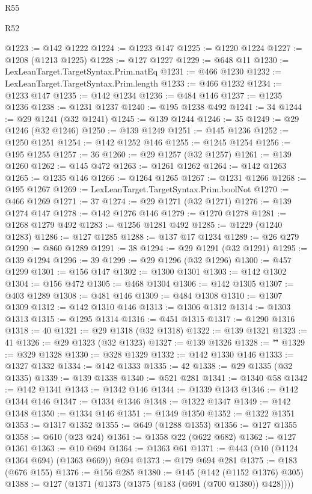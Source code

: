 \begin{lexlean}{R55}
\begin{lexlean}{R52}
\begin{coremodule}
{{{{{{{{{{{{{{{{{{{{{{{{{{{{{{{{{{{{{{{{{{{{{{{{{{{{{{{{{{{{{{{{{{{{{{{{{{{{{{{{{{{{{{{{{{{{{{{{{{{{{{{{{{{{{{{{{{{{{{{{{{{{{{{{{{{{{{{{{{{{{{{{{{{{{{{{{{{{{{{{{{{{{{{{{{{{{{{{{{{{{{{{{{{{{{{{{{{{{{@1223 := @142 @1222
@1224 := @1223 @147
@1225 := @1220 @1224
@1227 := @1208 (@1213 @1225)
@1228 := @127 @1227
@1229 := @648 @11
@1230 := LexLeanTarget.TargetSyntax.Prim.natEq
@1231 := @466 @1230
@1232 := LexLeanTarget.TargetSyntax.Prim.length
@1233 := @466 @1232
@1234 := @1233 @147
@1235 := @142 @1234
@1236 := @484 @146
@1237 := @1235 @1236
@1238 := @1231 @1237
@1240 := @195 @1238 @492
@1241 := 34
@1244 := @29 @1241 (@32 @1241)
@1245 := @139 @1244
@1246 := 35
@1249 := @29 @1246 (@32 @1246)
@1250 := @139 @1249
@1251 := @145 @1236
@1252 := @1250 @1251
@1254 := @142 @1252 @146
@1255 := @1245 @1254
@1256 := @195 @1255
@1257 := 36
@1260 := @29 @1257 (@32 @1257)
@1261 := @139 @1260
@1262 := @145 @472
@1263 := @1261 @1262
@1264 := @142 @1263
@1265 := @1235 @146
@1266 := @1264 @1265
@1267 := @1231 @1266
@1268 := @195 @1267
@1269 := LexLeanTarget.TargetSyntax.Prim.boolNot
@1270 := @466 @1269
@1271 := 37
@1274 := @29 @1271 (@32 @1271)
@1276 := @139 @1274 @147
@1278 := @142 @1276 @146
@1279 := @1270 @1278
@1281 := @1268 @1279 @492
@1283 := @1256 @1281 @492
@1285 := @1229 (@1240 @1283)
@1286 := @127 @1285
@1288 := @137 @17 @1234
@1289 := @26 @279
@1290 := @860 @1289
@1291 := 38
@1294 := @29 @1291 (@32 @1291)
@1295 := @139 @1294
@1296 := 39
@1299 := @29 @1296 (@32 @1296)
@1300 := @457 @1299
@1301 := @156 @147
@1302 := @1300 @1301
@1303 := @142 @1302
@1304 := @156 @472
@1305 := @468 @1304
@1306 := @142 @1305
@1307 := @403 @1289
@1308 := @481 @146
@1309 := @484 @1308
@1310 := @1307 @1309
@1312 := @142 @1310 @146
@1313 := @1306 @1312
@1314 := @1303 @1313
@1315 := @1295 @1314
@1316 := @451 @1315
@1317 := @1290 @1316
@1318 := 40
@1321 := @29 @1318 (@32 @1318)
@1322 := @139 @1321
@1323 := 41
@1326 := @29 @1323 (@32 @1323)
@1327 := @139 @1326
@1328 := "\""
@1329 := @329 @1328
@1330 := @328 @1329
@1332 := @142 @1330 @146
@1333 := @1327 @1332
@1334 := @142 @1333
@1335 := 42
@1338 := @29 @1335 (@32 @1335)
@1339 := @139 @1338
@1340 := @521 @281
@1341 := @1340 @58
@1342 := @142 @1341
@1343 := @1342 @146
@1344 := @1339 @1343
@1346 := @142 @1344 @146
@1347 := @1334 @1346
@1348 := @1322 @1347
@1349 := @142 @1348
@1350 := @1334 @146
@1351 := @1349 @1350
@1352 := @1322 @1351
@1353 := @1317 @1352
@1355 := @649 (@1288 @1353)
@1356 := @127 @1355
@1358 := @610 (@23 @24)
@1361 := @1358 @22 (@622 @682)
@1362 := @127 @1361
@1363 := @10 @694
@1364 := @1363 @61
@1371 := @443 (@10 (@1124 @1364 @694) (@1363 @669)) @694
@1373 := @179 @694 @281
@1375 := @183 (@676 @155)
@1376 := @156 @285
@1380 := @145 (@142 (@1152 @1376) @305)
@1388 := @127 (@1371 (@1373 (@1375 (@183 (@691 (@700 @1380)) @428))))
}}}}}}}}}}}}}}}}}}}}}}}}}}}}}}}}}}}}}}}}}}}}}}}}}}}}}}}}}}}}}}}}}}}}}}}}}}}}}}}}}}}}}}}}}}}}}}}}}}}}}}}}}}}}}}}}}}}}}}}}}}}}}}}}}}}}}}}}}}}}}}}}}}}}}}}}}}}}}}}}}}}}}}}}}}}}}}}}}}}}}}}}}}}}}}}}}}}}}}
\end{coremodule}
\end{lexlean}
\end{lexlean}
